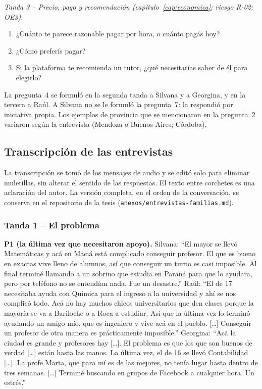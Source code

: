 \emph{Tanda 3 -- Precio, pago y recomendación (capítulo~\ref{cap:economica};
riesgo R-02; OE3).}

\begin{enumerate}[resume]
    \item ¿Cuánto te parece razonable pagar por hora, o cuánto pagás hoy?
    \item ¿Cómo preferís pagar?
    \item Si la plataforma te recomienda un tutor, ¿qué necesitarías saber
          de él para elegirlo?
\end{enumerate}

La pregunta~4 se formuló en la segunda tanda a Silvana y a Georgina, y
en la tercera a Raúl. A Silvana no se le formuló la pregunta~7: la
respondió por iniciativa propia. Los ejemplos de provincia que se
mencionaron en la pregunta~2 variaron según la entrevista (Mendoza o
Buenos Aires; Córdoba).

\subsection{Transcripción de las entrevistas}

La transcripción se tomó de los mensajes de audio y se editó solo para
eliminar muletillas, sin alterar el sentido de las respuestas. El texto
entre corchetes es una aclaración del autor. La versión completa, en el
orden de la conversación, se conserva en el repositorio de la tesis
(\texttt{anexos/entrevistas-familias.md}).

\subsubsection*{Tanda 1 -- El problema}

\textbf{P1 (la última vez que necesitaron apoyo).} Silvana: ``El mayor se
llevó Matemáticas y acá en Maciá está complicado conseguir profesor. El
que es bueno en exactas vive lleno de alumnos, así que conseguir un turno
es casi imposible. Al final terminé llamando a un sobrino que estudia en
Paraná para que lo ayudara, pero por teléfono no se entendían nada. Fue
un desastre.'' Raúl: ``El de 17 necesitaba ayuda con Química para el
ingreso a la universidad y ahí se nos complicó todo. Acá no hay muchos
chicos universitarios que den clases porque la mayoría se va a Bariloche
o a Roca a estudiar. Así que la última vez lo terminó ayudando un amigo
mío, que es ingeniero y vive acá en el pueblo. [\ldots] Conseguir un
profesor de otra manera es prácticamente imposible.'' Georgina: ``Acá la
ciudad es grande y profesores hay [\ldots]. El problema es que los que son
buenos de verdad [\ldots] están hasta las manos. La última vez, el de 16
se llevó Contabilidad [\ldots]. La profe Marta, que para mí es de las
mejores, no tenía lugar hasta dentro de tres semanas. [\ldots] Terminé
buscando en grupos de Facebook a cualquier hora. Un estrés.''

